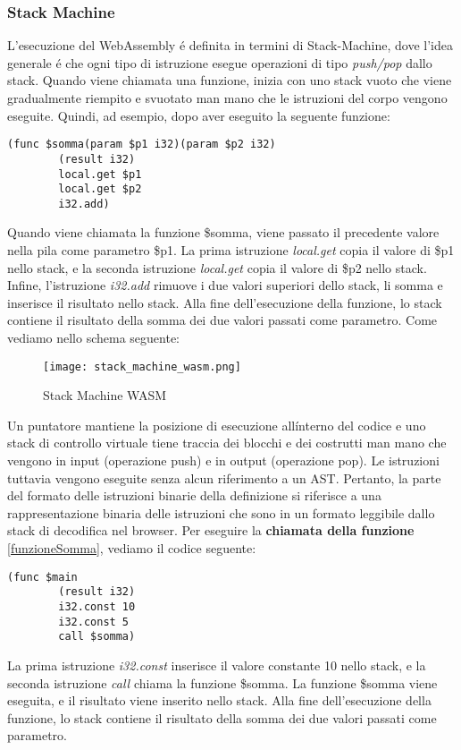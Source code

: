 \documentclass[../../main.tex]{subfiles}
\begin{document}
\subsubsection{Stack Machine}
L'esecuzione del WebAssembly é definita in termini di Stack-Machine, dove l'idea generale é che ogni tipo di istruzione esegue operazioni di tipo \textit{push/pop} dallo stack.
Quando viene chiamata una funzione, inizia con uno stack vuoto che viene gradualmente riempito e svuotato man mano che le istruzioni del corpo vengono eseguite. Quindi, ad esempio, dopo aver eseguito la seguente funzione:
\begin{lstlisting}[language=WebAssembly, label={lst:funzioneSomma}]
    (func $somma(param $p1 i32)(param $p2 i32)
        (result i32)
        local.get $p1
        local.get $p2
        i32.add)
\end{lstlisting}
Quando viene chiamata la funzione \$somma, viene passato il precedente valore nella pila come parametro \$p1. La prima istruzione \textit{local.get} copia il valore di \$p1 nello stack, e la seconda istruzione \textit{local.get} copia il valore di \$p2 nello stack. Infine, l'istruzione \textit{i32.add} rimuove i due valori superiori dello stack, li somma e inserisce il risultato nello stack. Alla fine dell'esecuzione della funzione, lo stack contiene il risultato della somma dei due valori passati come parametro.
Come vediamo nello schema seguente:
\begin{figure}
    \centering
    \texttt{[image: stack\_machine\_wasm.png]}
    \caption{Stack Machine WASM}
    \label{fig:stack_machine}
\end{figure}
Un puntatore mantiene la posizione di esecuzione all\' interno del codice e uno stack di controllo virtuale tiene traccia dei blocchi e dei costrutti man mano che vengono in input (operazione push) e in output (operazione pop). Le istruzioni tuttavia vengono eseguite senza alcun riferimento a un AST. Pertanto, la parte del formato delle istruzioni binarie della definizione si riferisce a una rappresentazione binaria delle istruzioni che sono in un formato leggibile dallo stack di decodifica nel browser.\cite{amslaurea20464}
Per eseguire la \textbf{chiamata della funzione} \ref{funzioneSomma}, vediamo il codice seguente:
\begin{lstlisting}[language=WebAssembly]
    (func $main
        (result i32)
        i32.const 10
        i32.const 5
        call $somma)
\end{lstlisting}
La prima istruzione \textit{i32.const} inserisce il valore constante 10 nello stack, e la seconda istruzione \textit{call} chiama la funzione \$somma. La funzione \$somma viene eseguita, e il risultato viene inserito nello stack. Alla fine dell'esecuzione della funzione, lo stack contiene il risultato della somma dei due valori passati come parametro.
\end{document}
